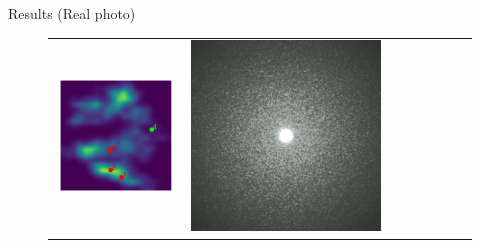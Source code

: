 \documentclass[final]{beamer}
\newlength{\twocolwid}
\newlength{\resultwidth}
\begin{document}
\begin{frame}[t]
\begin{columns}[t]
\begin{column}{\twocolwid}
\begin{block}{Results (Real photo)}
\begin{figure}[t]
\begin{tabular}{ccrclccc}
            		\includegraphics[width=\resultwidth]{real/flake/posterior.pdf} &
            		\includegraphics[width=\resultwidth]{real/flake/good1.jpg} &

\end{tabular}
\end{figure}
\end{block}
\end{column}
\end{columns}
\end{frame}
\end{document}
